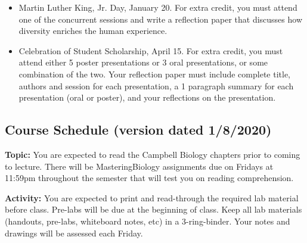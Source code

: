 \documentclass{tufte-handout}
\begin{document}
\begin{fullwidth}
\begin{itemize}
\item Martin Luther King, Jr. Day, January 20. For extra credit, you must attend one of the concurrent sessions and write a reflection paper that discusses how diversity enriches the human experience. 
\item Celebration of Student Scholarship, April 15.  For extra credit, you must attend either 5 poster presentations or 3 oral presentations, or some combination of the two.  Your reflection paper must include complete title, authors and session for each presentation, a 1 paragraph summary for each presentation (oral or poster), and your reflections on the presentation.  	
\end{itemize}









\newpage
\subsection{Course Schedule (version dated 1/8/2020)}
%

\textbf{Topic:} You are expected to read the Campbell Biology chapters prior to coming to lecture.  There will be MasteringBiology assignments due on Fridays at 11:59pm throughout the semester that will test you on reading comprehension. 

\textbf{Activity:} You are expected to print and read-through the required lab material before class. Pre-labs will be due at the beginning of class. Keep all lab materials (handouts, pre-labs, whiteboard notes, etc) in a 3-ring-binder. Your notes and drawings will be assessed each Friday.


\end{fullwidth}
\end{document}
